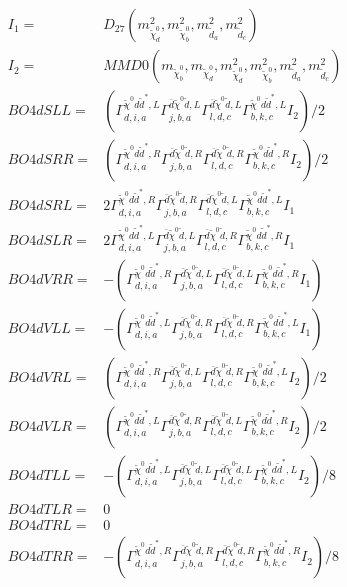 \documentclass[A4,landscape]{article}
\begin{document}
\begin{align} 
I_1 = & D_{27}(m^2_{\tilde{\chi}^0_{{d}}}, m^2_{\tilde{\chi}^0_{{b}}}, m^2_{\tilde{d}_{{a}}}, m^2_{\tilde{d}_{{c}}}) \\ 
I_2 = & MMD0(m_{\tilde{\chi}^0_{{b}}}, m_{\tilde{\chi}^0_{{d}}}, m^2_{\tilde{\chi}^0_{{d}}}, m^2_{\tilde{\chi}^0_{{b}}}, m^2_{\tilde{d}_{{a}}}, m^2_{\tilde{d}_{{c}}}) \\ 
  BO4dSLL= & ( \Gamma^{\tilde{\chi}^0 d \tilde{d}^*,L}_{d, i, a} \Gamma^{\bar{d}\tilde{\chi}^0 \tilde{d} ,L}_{j, b, a} \Gamma^{\bar{d}\tilde{\chi}^0 \tilde{d} ,L}_{l, d, c} \Gamma^{\tilde{\chi}^0 d \tilde{d}^*,L}_{b, k, c} I_2)/2 \\ 
  BO4dSRR= & ( \Gamma^{\tilde{\chi}^0 d \tilde{d}^*,R}_{d, i, a} \Gamma^{\bar{d}\tilde{\chi}^0 \tilde{d} ,R}_{j, b, a} \Gamma^{\bar{d}\tilde{\chi}^0 \tilde{d} ,R}_{l, d, c} \Gamma^{\tilde{\chi}^0 d \tilde{d}^*,R}_{b, k, c} I_2)/2 \\ 
  BO4dSRL= & 2  \Gamma^{\tilde{\chi}^0 d \tilde{d}^*,R}_{d, i, a} \Gamma^{\bar{d}\tilde{\chi}^0 \tilde{d} ,R}_{j, b, a} \Gamma^{\bar{d}\tilde{\chi}^0 \tilde{d} ,L}_{l, d, c} \Gamma^{\tilde{\chi}^0 d \tilde{d}^*,L}_{b, k, c} I_1 \\ 
  BO4dSLR= & 2  \Gamma^{\tilde{\chi}^0 d \tilde{d}^*,L}_{d, i, a} \Gamma^{\bar{d}\tilde{\chi}^0 \tilde{d} ,L}_{j, b, a} \Gamma^{\bar{d}\tilde{\chi}^0 \tilde{d} ,R}_{l, d, c} \Gamma^{\tilde{\chi}^0 d \tilde{d}^*,R}_{b, k, c} I_1 \\ 
  BO4dVRR= & -( \Gamma^{\tilde{\chi}^0 d \tilde{d}^*,R}_{d, i, a} \Gamma^{\bar{d}\tilde{\chi}^0 \tilde{d} ,L}_{j, b, a} \Gamma^{\bar{d}\tilde{\chi}^0 \tilde{d} ,L}_{l, d, c} \Gamma^{\tilde{\chi}^0 d \tilde{d}^*,R}_{b, k, c} I_1) \\ 
  BO4dVLL= & -( \Gamma^{\tilde{\chi}^0 d \tilde{d}^*,L}_{d, i, a} \Gamma^{\bar{d}\tilde{\chi}^0 \tilde{d} ,R}_{j, b, a} \Gamma^{\bar{d}\tilde{\chi}^0 \tilde{d} ,R}_{l, d, c} \Gamma^{\tilde{\chi}^0 d \tilde{d}^*,L}_{b, k, c} I_1) \\ 
  BO4dVRL= & ( \Gamma^{\tilde{\chi}^0 d \tilde{d}^*,R}_{d, i, a} \Gamma^{\bar{d}\tilde{\chi}^0 \tilde{d} ,L}_{j, b, a} \Gamma^{\bar{d}\tilde{\chi}^0 \tilde{d} ,R}_{l, d, c} \Gamma^{\tilde{\chi}^0 d \tilde{d}^*,L}_{b, k, c} I_2)/2 \\ 
  BO4dVLR= & ( \Gamma^{\tilde{\chi}^0 d \tilde{d}^*,L}_{d, i, a} \Gamma^{\bar{d}\tilde{\chi}^0 \tilde{d} ,R}_{j, b, a} \Gamma^{\bar{d}\tilde{\chi}^0 \tilde{d} ,L}_{l, d, c} \Gamma^{\tilde{\chi}^0 d \tilde{d}^*,R}_{b, k, c} I_2)/2 \\ 
  BO4dTLL= & -( \Gamma^{\tilde{\chi}^0 d \tilde{d}^*,L}_{d, i, a} \Gamma^{\bar{d}\tilde{\chi}^0 \tilde{d} ,L}_{j, b, a} \Gamma^{\bar{d}\tilde{\chi}^0 \tilde{d} ,L}_{l, d, c} \Gamma^{\tilde{\chi}^0 d \tilde{d}^*,L}_{b, k, c} I_2)/8 \\ 
  BO4dTLR= & 0 \\ 
  BO4dTRL= & 0 \\ 
  BO4dTRR= & -( \Gamma^{\tilde{\chi}^0 d \tilde{d}^*,R}_{d, i, a} \Gamma^{\bar{d}\tilde{\chi}^0 \tilde{d} ,R}_{j, b, a} \Gamma^{\bar{d}\tilde{\chi}^0 \tilde{d} ,R}_{l, d, c} \Gamma^{\tilde{\chi}^0 d \tilde{d}^*,R}_{b, k, c} I_2)/8 \\ 
\end{align} 
\end{document}

